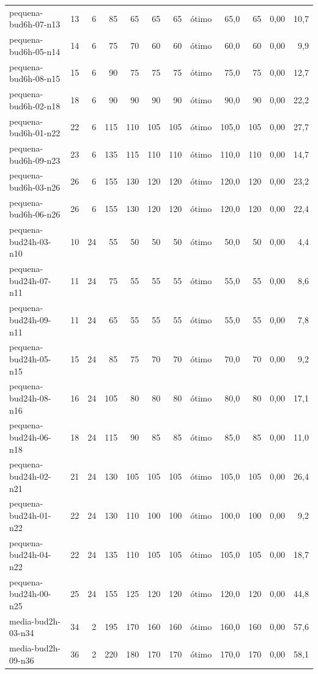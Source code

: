 \begin{longtable}{@{}lrrrrrrlrrrr@{}}
pequena-bud6h-07-n13 & 13 & 6 & 85 & 65 & 65 & 65 & ótimo & 65,0 & 65 & 0,00 & 10,7 \\
pequena-bud6h-05-n14 & 14 & 6 & 75 & 70 & 60 & 60 & ótimo & 60,0 & 60 & 0,00 & 9,9 \\
pequena-bud6h-08-n15 & 15 & 6 & 90 & 75 & 75 & 75 & ótimo & 75,0 & 75 & 0,00 & 12,7 \\
pequena-bud6h-02-n18 & 18 & 6 & 90 & 90 & 90 & 90 & ótimo & 90,0 & 90 & 0,00 & 22,2 \\
pequena-bud6h-01-n22 & 22 & 6 & 115 & 110 & 105 & 105 & ótimo & 105,0 & 105 & 0,00 & 27,7 \\
pequena-bud6h-09-n23 & 23 & 6 & 135 & 115 & 110 & 110 & ótimo & 110,0 & 110 & 0,00 & 14,7 \\
pequena-bud6h-03-n26 & 26 & 6 & 155 & 130 & 120 & 120 & ótimo & 120,0 & 120 & 0,00 & 23,2 \\
pequena-bud6h-06-n26 & 26 & 6 & 155 & 130 & 120 & 120 & ótimo & 120,0 & 120 & 0,00 & 22,4 \\
pequena-bud24h-03-n10 & 10 & 24 & 55 & 50 & 50 & 50 & ótimo & 50,0 & 50 & 0,00 & 4,4 \\
pequena-bud24h-07-n11 & 11 & 24 & 75 & 55 & 55 & 55 & ótimo & 55,0 & 55 & 0,00 & 8,6 \\
pequena-bud24h-09-n11 & 11 & 24 & 65 & 55 & 55 & 55 & ótimo & 55,0 & 55 & 0,00 & 7,8 \\
pequena-bud24h-05-n15 & 15 & 24 & 85 & 75 & 70 & 70 & ótimo & 70,0 & 70 & 0,00 & 9,2 \\
pequena-bud24h-08-n16 & 16 & 24 & 105 & 80 & 80 & 80 & ótimo & 80,0 & 80 & 0,00 & 17,1 \\
pequena-bud24h-06-n18 & 18 & 24 & 115 & 90 & 85 & 85 & ótimo & 85,0 & 85 & 0,00 & 11,0 \\
pequena-bud24h-02-n21 & 21 & 24 & 130 & 105 & 105 & 105 & ótimo & 105,0 & 105 & 0,00 & 26,4 \\
pequena-bud24h-01-n22 & 22 & 24 & 130 & 110 & 100 & 100 & ótimo & 100,0 & 100 & 0,00 & 9,2 \\
pequena-bud24h-04-n22 & 22 & 24 & 135 & 110 & 105 & 105 & ótimo & 105,0 & 105 & 0,00 & 18,7 \\
pequena-bud24h-00-n25 & 25 & 24 & 155 & 125 & 120 & 120 & ótimo & 120,0 & 120 & 0,00 & 44,8 \\
media-bud2h-03-n34 & 34 & 2 & 195 & 170 & 160 & 160 & ótimo & 160,0 & 160 & 0,00 & 57,6 \\
media-bud2h-09-n36 & 36 & 2 & 220 & 180 & 170 & 170 & ótimo & 170,0 & 170 & 0,00 & 58,1 \\

\end{longtable}
